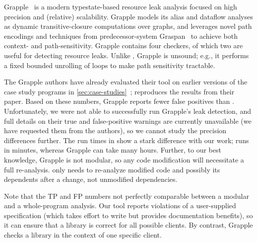 Grapple~\cite{zuo2019grapple} is a modern typestate-based resource leak analysis
focused on high precision and (relative) scalability. Grapple models its alias and
dataflow analyses as dynamic transitive-closure computations over graphs, and
leverages novel path encodings and techniques from predecessor-system
Graspan~\cite{wang2017graspan} to achieve both context- and path-sensitivity.  
Grapple contains four checkers, of which two are useful for detecting
resource leaks.  Unlike \Tool, Grapple is unsound; e.g., it performs a fixed bounded unrolling
of loops to make path sensitivity tractable.

The Grapple authors have already evaluated their tool on earlier
versions of the case study programs in
\cref{sec:case-studies}~\cite{zuo2019grapple};  reproduces the
results from their paper.  Based on these numbers, Grapple reports fewer false
positives than \Tool.  Unfortunately, we were not able to successfully run
Grapple's leak detection, and full details on their true and false-positive
warnings are currently unavailable (we have requested them from the authors), so
we cannot study the precision differences further.  The run times in
 show a stark difference with our work; \Tool runs in minutes,
whereas Grapple can take many hours. Further, to our best knowledge, Grapple is
not modular, so any code modification will necessitate a full re-analysis.
\Tool only needs to re-analyze modified code and possibly its dependents after
a change, not unmodified dependencies.


 Note that the TP and FP numbers not perfectly comparable between a modular
and a whole-program analysis.
Our tool reports violations of a user-supplied specification
(which takes effort to write but provides documentation benefits), so it
can ensure that a library is correct for all possible clients.  By
contrast, Grapple checks a library in the context of one specific client.

